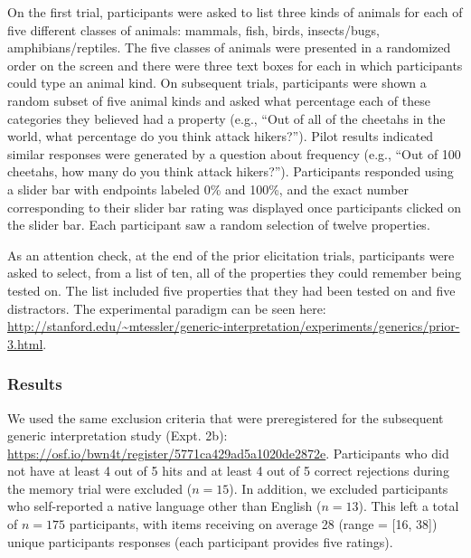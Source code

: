 \documentclass[floatsintext,doc]{apa6}
\begin{document}
On the first trial, participants were asked to list three kinds of animals for each of five different classes of animals: mammals, fish, birds, insects/bugs, amphibians/reptiles.
The five classes of animals were presented in a randomized order on the screen and there were three text boxes for each in which participants could type an animal kind.
On subsequent trials, participants were shown a random subset of five animal kinds and asked what percentage each of these categories they believed had a property (e.g., \enquote{Out of all of the cheetahs in the world, what percentage do you think attack hikers?}).
Pilot results indicated similar responses were generated by a question about frequency (e.g., \enquote{Out of 100 cheetahs, how many do you think attack hikers?}).
Participants responded using a slider bar with endpoints labeled 0\% and 100\%, and the exact number corresponding to their slider bar rating was displayed once participants clicked on the slider bar.
Each participant saw a random selection of twelve properties.

As an attention check, at the end of the prior elicitation trials, participants were asked to select, from a list of ten, all of the properties they could remember being tested on.
The list included five properties that they had been tested on and five distractors.
The experimental paradigm can be seen here: \url{http://stanford.edu/~mtessler/generic-interpretation/experiments/generics/prior-3.html}.

\hypertarget{results}{%
\subsubsection{Results}\label{results}}

We used the same exclusion criteria that were preregistered for the subsequent generic interpretation study (Expt. 2b): \url{https://osf.io/bwn4t/register/5771ca429ad5a1020de2872e}.
Participants who did not have at least 4 out of 5 hits and at least 4 out of 5 correct rejections during the memory trial were excluded (\(n = 15\)).
In addition, we excluded participants who self-reported a native language other than English (\(n = 13\)).
This left a total of \(n = 175\) participants, with items receiving on average 28 (range = {[}16, 38{]}) unique participants responses (each participant provides five ratings).
\end{document}
